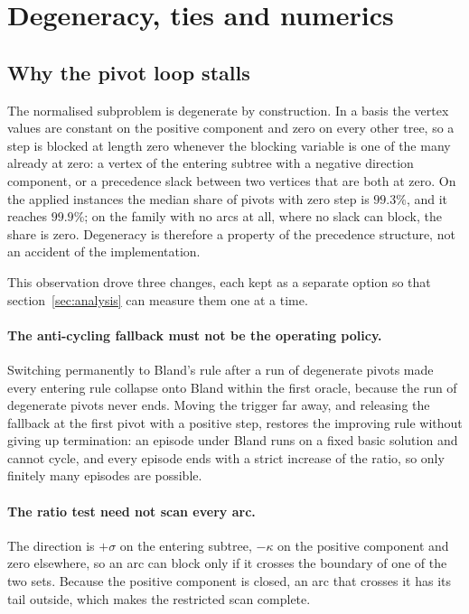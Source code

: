 \section{Degeneracy, ties and numerics}
\label{sec:robustness}

\subsection{Why the pivot loop stalls}

The normalised subproblem is degenerate by construction. In a basis the vertex
values are constant on the positive component and zero on every other tree, so a
step is blocked at length zero whenever the blocking variable is one of the many
already at zero: a vertex of the entering subtree with a negative direction
component, or a precedence slack between two vertices that are both at zero. On the
applied instances the median share of pivots with zero step is $99.3\%$, and it
reaches $99.9\%$; on the family with no arcs at all, where no slack can block,
the share is zero. Degeneracy is
therefore a property of the precedence structure, not an accident of the
implementation.

This observation drove three changes, each kept as a separate option so that
section~\ref{sec:analysis} can measure them one at a time.

\paragraph{The anti-cycling fallback must not be the operating policy.} Switching
permanently to Bland's rule after a run of degenerate pivots made every entering
rule collapse onto Bland within the first oracle, because the run of degenerate
pivots never ends. Moving the trigger far away, and releasing the fallback at the
first pivot with a positive step, restores the improving rule without giving up
termination: an episode under Bland runs on a fixed basic solution and cannot
cycle, and every episode ends with a strict increase of the ratio, so only
finitely many episodes are possible.

\paragraph{The ratio test need not scan every arc.} The direction is $+\sigma$ on
the entering subtree, $-\kappa$ on the positive component and zero elsewhere, so
an arc can block only if it crosses the boundary of one of the two sets. Because
the positive component is closed, an arc that crosses it has its tail outside,
which makes the restricted scan complete.


